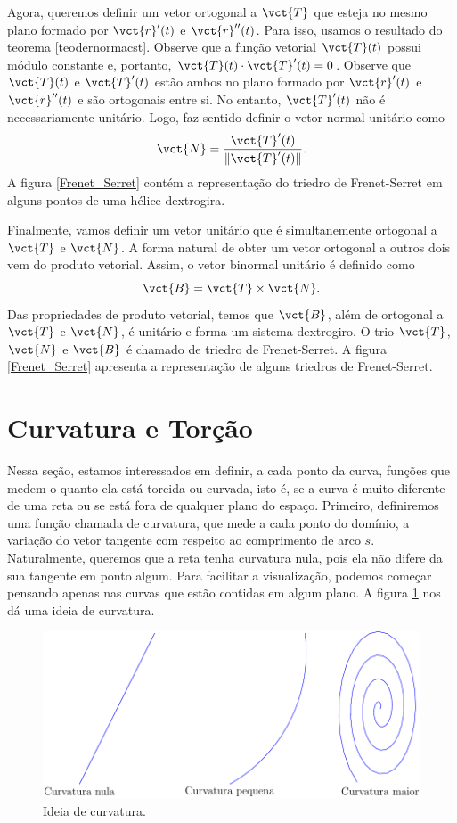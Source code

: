 Agora, queremos definir um vetor ortogonal a $\vct{T}$ que esteja no mesmo plano formado por $\vct{r}'(t)$ e $\vct{r}''(t)$. Para isso, usamos o resultado do teorema \ref{teodernormacst}. Observe que a função vetorial $\vct{T}(t)$ possui módulo constante e, portanto, $\vct{T}(t)\cdot \vct{T}'(t)=0$. Observe que $\vct{T}(t)$ e $\vct{T}'(t)$ estão ambos no plano formado por $\vct{r}'(t)$ e $\vct{r}''(t)$ e são ortogonais entre si. No entanto, $\vct{T}'(t)$ não é necessariamente unitário. Logo, faz sentido definir o vetor normal unitário como
$$
\vct{N}=\frac{\vct{T}'(t)}{\|\vct{T}'(t)\|}.
$$
A figura \ref{Frenet_Serret} contém a representação do triedro de Frenet-Serret em alguns pontos de uma hélice dextrogira.

Finalmente, vamos definir um vetor unitário que é simultanemente ortogonal a $\vct{T}$ e $\vct{N}$. A forma natural de obter um vetor ortogonal a outros dois vem do produto vetorial. Assim, o vetor binormal unitário é definido como
$$
\vct{B}=\vct{T}\times\vct{N}.
$$
Das propriedades de produto vetorial, temos que $\vct{B}$, além de ortogonal a $\vct{T}$ e $\vct{N}$, é unitário e forma um sistema dextrogiro. O trio $\vct{T}$, $\vct{N}$ e $\vct{B}$ é chamado de triedro de Frenet-Serret. A figura \ref{Frenet_Serret} apresenta a representação de alguns triedros de Frenet-Serret.


\section{Curvatura e Torção}

Nessa seção, estamos interessados em definir, a cada ponto da curva, funções que medem o quanto ela está torcida ou curvada, isto é, se a curva é muito diferente de uma reta ou se está fora de qualquer plano do espaço. Primeiro, definiremos uma função chamada de curvatura, que mede a cada ponto do domínio, a variação do vetor tangente com respeito ao comprimento de arco $s$. Naturalmente, queremos que a reta tenha curvatura nula, pois ela não difere da sua tangente em ponto algum. Para facilitar a visualização, podemos começar pensando apenas nas curvas que estão contidas em algum plano. A figura \ref{curvatura} nos dá uma ideia de curvatura.


\begin{figure}
\begin{center}
    \includegraphics{./cap_curvas/figs/exemplos_de_curvatura}
 \caption{Ideia de curvatura.\label{curvatura}}
  \end{center}
\end{figure}
 
